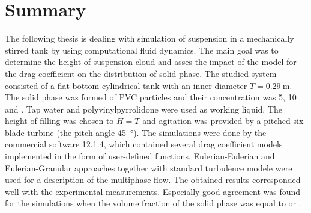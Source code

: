 \section*{Summary}
The following thesis is dealing with simulation of suspension in a mechanically stirred tank by using computational fluid dynamics. The main goal was to determine the height of suspension cloud and asses the impact of the model for the drag coefficient on the distribution of solid phase. The studied system consisted of a flat bottom cylindrical tank with an inner diameter $T=\SI{0.29}{\meter}$. The solid phase was formed of PVC particles and their concentration was 5, 10 and . Tap water and polyvinylpyrrolidone were used as working liquid. The height of filling was chosen to $H=T$ and agitation was provided by a pitched six-blade turbine (the pitch angle \SI{45}{\degree}). The simulations were done by the commercial software \flu{} 12.1.4, which contained several drag coefficient models implemented in the form of user-defined functions. Eulerian-Eulerian and Eulerian-Granular approaches together with standard \keps{} turbulence modele were used for a description of the multiphase flow. The obtained results corresponded well with the experimental measurements. Especially good agreement was found for the simulations when the volume fraction of the solid phase was equal to  or .
